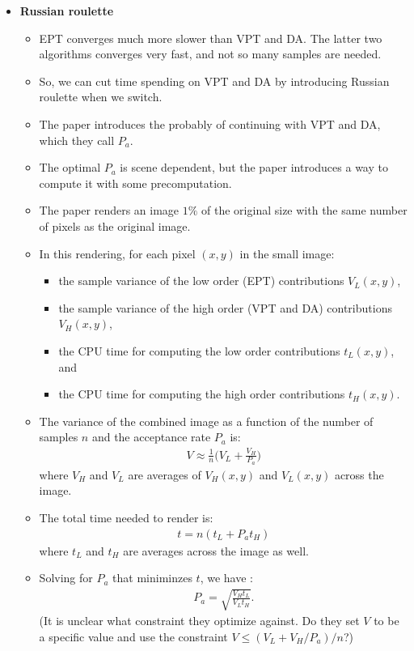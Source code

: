 \documentclass[10pt]{article}
\begin{document}
\begin{itemize}
    \item {\bf Russian roulette}
    \begin{itemize}
      \item EPT converges much more slower than VPT and DA.  The latter two algorithms converges very fast, and not so many samples are needed.

      \item So, we can cut time spending on VPT and DA by introducing Russian roulette when we switch.

      \item The paper introduces the probably of continuing with VPT and DA, which they call $P_a$.

      \item The optimal $P_a$ is scene dependent, but the paper introduces a way to compute it with some precomputation.

      \item The paper renders an image $1\%$ of the original size with the same number of pixels as the original image.

      \item In this rendering, for each pixel $(x,y)$ in the small image:
      \begin{itemize}
        \item the sample variance of the low order (EPT) contributions $V_L(x,y)$,
        \item the sample variance of the high order (VPT and DA) contributions $V_H(x,y)$,
        \item the CPU time for computing the low order contributions $t_L(x,y)$, and
        \item the CPU time for computing the high order contributions $t_H(x,y)$.
      \end{itemize}

      \item The variance of the combined image as a function of the number of samples $n$ and the acceptance rate $P_a$ is:
      \begin{align*}
        V \approx \frac{1}{n} \bigg( V_L + \frac{V_H}{P_a} \bigg)
      \end{align*}
      where $V_H$ and $V_L$ are averages of $V_H(x,y)$ and $V_L(x,y)$ across the image.

      \item The total time needed to render is:
      \begin{align*}
        t = n (t_L + P_a t_H)
      \end{align*}
      where $t_L$ and $t_H$ are averages across the image as well.

      \item Solving for $P_a$ that miniminzes $t$, we have :
      \begin{align*}
        P_a = \sqrt{\frac{V_H t_L}{V_L t_H}}.
      \end{align*}
      (It is unclear what constraint they optimize against.  Do they set $V$ to be a specific value and use the constraint $V \leq (V_L + V_H/P_a)/n$?)
    \end{itemize}
  \end{itemize}

  
    
\end{document}

